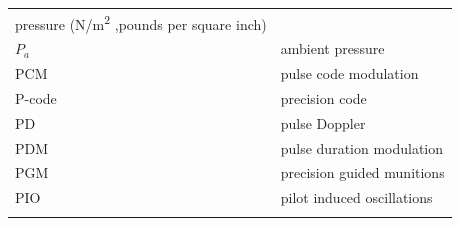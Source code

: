 \documentclass[
]{book}
\begin{document}
\begin{longtable}[]{@{}ll@{}}
\begin{minipage}[t]{0.47\columnwidth}
pressure (N/m\textsuperscript{2} ,pounds per square inch)\strut
\end{minipage}\tabularnewline
\begin{minipage}[t]{0.47\columnwidth}\raggedright
\(P_a\)\strut
\end{minipage} & \begin{minipage}[t]{0.47\columnwidth}\raggedright
ambient pressure\strut
\end{minipage}\tabularnewline
\begin{minipage}[t]{0.47\columnwidth}\raggedright
PCM\strut
\end{minipage} & \begin{minipage}[t]{0.47\columnwidth}\raggedright
pulse code modulation\strut
\end{minipage}\tabularnewline
\begin{minipage}[t]{0.47\columnwidth}\raggedright
P-code\strut
\end{minipage} & \begin{minipage}[t]{0.47\columnwidth}\raggedright
precision code\strut
\end{minipage}\tabularnewline
\begin{minipage}[t]{0.47\columnwidth}\raggedright
PD\strut
\end{minipage} & \begin{minipage}[t]{0.47\columnwidth}\raggedright
pulse Doppler\strut
\end{minipage}\tabularnewline
\begin{minipage}[t]{0.47\columnwidth}\raggedright
PDM\strut
\end{minipage} & \begin{minipage}[t]{0.47\columnwidth}\raggedright
pulse duration modulation\strut
\end{minipage}\tabularnewline
\begin{minipage}[t]{0.47\columnwidth}\raggedright
PGM\strut
\end{minipage} & \begin{minipage}[t]{0.47\columnwidth}\raggedright
precision guided munitions\strut
\end{minipage}\tabularnewline
\begin{minipage}[t]{0.47\columnwidth}\raggedright
PIO\strut
\end{minipage} & \begin{minipage}[t]{0.47\columnwidth}\raggedright
pilot induced oscillations\strut
\end{minipage}\tabularnewline
\begin{minipage}[t]{0.47\columnwidth}\raggedright

\end{minipage}
\end{longtable}
\end{document}
